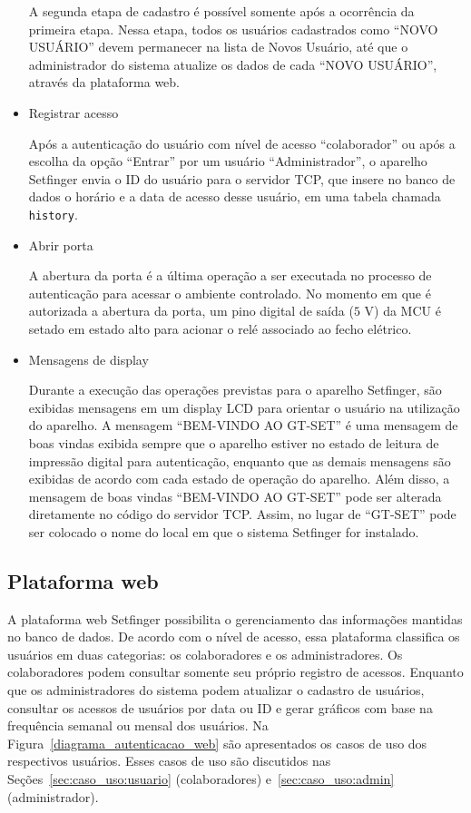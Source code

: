 \begin{itemize}
      A segunda etapa de cadastro é possível somente após a ocorrência da primeira etapa. Nessa etapa, todos os usuários cadastrados como ``NOVO USUÁRIO'' devem permanecer na lista de Novos Usuário, até que o administrador do sistema atualize os dados de cada ``NOVO USUÁRIO'', através da plataforma web. 
      
      
      
      \item Registrar acesso
      
      Após a autenticação do usuário com nível de acesso ``colaborador'' ou após a escolha da opção ``Entrar'' por um usuário ``Administrador'', o aparelho Setfinger envia o ID do usuário para o servidor TCP, que insere no banco de dados o horário e a data de acesso desse usuário, em uma tabela chamada \verb!history!.
      
      \item Abrir porta
      
      A abertura da porta é a última operação a ser executada no processo de autenticação para acessar o ambiente controlado. No momento em que é autorizada a abertura da porta, um pino digital de saída ($5$ V) da MCU é setado em estado alto para acionar o relé associado ao fecho elétrico.
      
      \item Mensagens de display
      
      Durante a execução das operações previstas para o aparelho Setfinger, são exibidas mensagens em um display LCD para orientar o usuário na utilização do aparelho. A mensagem ``BEM-VINDO AO GT-SET'' é uma mensagem de boas vindas exibida sempre que o aparelho estiver no estado de leitura de impressão digital para autenticação, enquanto que as demais mensagens são exibidas de acordo com cada estado de operação do aparelho. Além disso, a mensagem de boas vindas ``BEM-VINDO AO GT-SET'' pode ser alterada diretamente no código do servidor TCP. Assim, no lugar de ``GT-SET'' pode ser colocado o nome do local em que o sistema Setfinger for instalado.
      
      
  \end{itemize}
  
  

\subsection{Plataforma web}

A plataforma web Setfinger possibilita o gerenciamento das informações mantidas no banco de dados. De acordo com o nível de acesso, essa plataforma classifica os usuários em duas categorias: os colaboradores e os administradores. Os colaboradores podem consultar somente seu próprio registro de acessos. Enquanto que os administradores do sistema podem atualizar o cadastro de usuários, consultar os acessos de usuários por data ou ID e gerar gráficos com base na frequência semanal ou mensal dos usuários. Na Figura~\ref{diagrama_autenticacao_web} são apresentados os casos de uso dos respectivos usuários. Esses casos de uso são discutidos nas Seções~\ref{sec:caso_uso:usuario} (colaboradores) e~\ref{sec:caso_uso:admin} (administrador).


